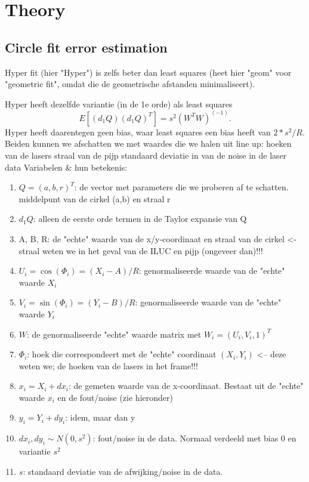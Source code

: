 \section{Theory}
\label{sec:theory}

\subsection{Circle fit error estimation}
\cite{alsharadqah_chernov_circle_fitting}
Hyper fit (hier "Hyper") is zelfs beter dan least squares (heet hier "geom" voor "geometric fit", omdat die de geometrische afstanden minimaliseert). 

Hyper heeft dezelfde variantie (in de 1e orde) als least squares  
\[
E[(d_1Q)(d_1Q)^T] = s^2 (W^T W)^(-1).
\] 
Hyper heeft daarentegen geen bias, waar least squares een bias heeft van $2 * s^2/R$. Beiden kunnen we afschatten we met waardes die we halen uit line up: 
hoeken van de lasers
straal van de pijp
standaard deviatie in van de noise in de laser data
Variabelen \& hun betekenis:  
\begin{enumerate}
    \item $Q = (a, b, r)^T$: de vector met parameters die we proberen af te schatten. middelpunt van de cirkel (a,b) en straal r
    \item $d_1Q$:  alleen de eerste orde termen in de Taylor expansie van Q
    \item A, B, R: de "echte" waarde van de x/y-coordinaat en straal van de cirkel <- straal weten we in het geval van de ILUC en pijp (ongeveer dan)!!!
    \item $U_i = \cos(\Phi_i) = (X_i-A)/R$: genormaliseerde waarde van de "echte" waarde  $X_i$
    \item $V_i = \sin(\Phi_i) = (Y_i-B)/R$: genormaliseerde waarde van de "echte" waarde  $Y_i$
    \item $W$: de genormaliseerde "echte" waarde matrix met $W_i = (U_i, V_i, 1)^T$
    \item $\Phi_i$: hoek die correspondeert met de "echte" coordinaat $(X_i, Y_i)$ <-- deze weten we; de hoeken van de lasers in het frame!!!
    \item $x_i = X_i + dx_i$: de gemeten waarde van de x-coordinaat. Bestaat uit de "echte" waarde $x_i$ en de fout/noise (zie hieronder)
    \item $y_i = Y_i + dy_i$: idem, maar dan y
    \item $dx_i, dy_i \sim N(0, s^2)$: fout/noise in de data. Normaal verdeeld met bias 0 en variantie $s^2$
    \item $s$: standaard deviatie van de afwijking/noise in de data.
\end{enumerate}
